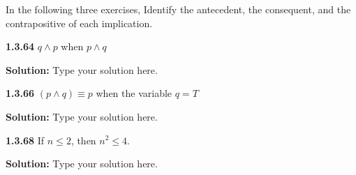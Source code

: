 \documentclass[12pt]{article}
\begin{document}
In the following three exercises, Identify the antecedent, the consequent, and the contrapositive of each implication.

\vspace{12pt}

\noindent\textbf{1.3.64} $q\wedge p$ when $p\wedge q$

\doublespacing
\textbf{Solution:} Type your solution here.


\singlespacing
\vspace{12pt}

\noindent\textbf{1.3.66} $(p\wedge q)\equiv p$ when the variable $q=T$

\doublespacing
\textbf{Solution:} Type your solution here.

\singlespacing
\vspace{12pt}

\noindent\textbf{1.3.68} If $n\leq2$, then $n^2\leq 4$.

\doublespacing
\textbf{Solution:} Type your solution here.


%
%
%
%
\end{document}
